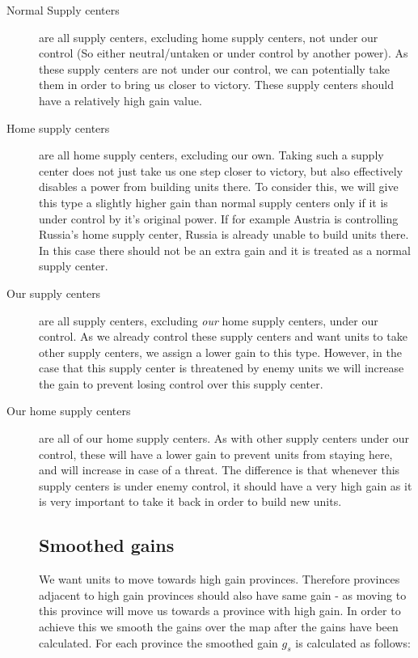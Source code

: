 \documentclass[a4paper]{article} %
\begin{document}
\begin{description} 

\item[Normal Supply centers]
are all supply centers, excluding home supply centers, not under our control (So either neutral/untaken or under control by another power). As these supply centers are not under our control, we can potentially take them in order to bring us closer to victory. These supply centers should have a relatively high gain value. 

\item[Home supply centers]
are all home supply centers, excluding our own. Taking such a supply center does not just take us one step closer to victory, but also effectively disables a power from building units there. To consider this, we will give this type a slightly higher gain than normal supply centers only if it is under control by it's original power. If for example Austria is controlling Russia's home supply center, Russia is already unable to build units there. In this case there should not be an extra gain and it is treated as a normal supply center.    

\item[Our supply centers] are all supply centers, excluding \textit{our} home supply centers, under our control. As we already control these supply centers and want units to take other supply centers, we assign a lower gain to this type. However, in the case that this supply center is threatened by enemy units we will increase the gain to prevent losing control over this supply center.  

\item[Our home supply centers] are all of our home supply centers. As with other supply centers under our control, these will have a lower gain to prevent units from staying here, and will increase in case of a threat. The difference is that whenever this supply centers is under enemy control, it should have a very high gain as it is very important to take it back in order to build new units.   

\subsection{Smoothed gains}
We want units to move towards high gain provinces. Therefore provinces adjacent to high gain provinces should also have same gain - as moving to this province will move us towards a province with high gain. In order to achieve this we smooth the gains over the map after the gains have been calculated. For each province the smoothed gain $g_s$ is calculated as follows:


\end{description}
\end{document}
